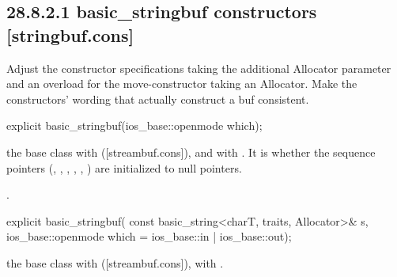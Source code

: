 \documentclass[ebook,11pt,article]{memoir}
\renewcommand{\iref}[1]{[#1]}
\begin{document}



\subsection{28.8.2.1 basic\_stringbuf constructors [stringbuf.cons]}
\begin{em}
Adjust the constructor specifications taking the additional Allocator parameter and an overload for the move-constructor taking an Allocator. Make the constructors' wording that actually construct a buf consistent.
\end{em}

\begin{itemdecl}
explicit basic_stringbuf(ios_base::openmode which);
\end{itemdecl}

\begin{itemdescr}
\pnum
\effects
{} the base class with
(\iref{streambuf.cons}), and
with .
It is
whether the sequence pointers
(, , ,
, , )
are initialized to null pointers.

\pnum
\ensures
{}.
\end{itemdescr}

\begin{itemdecl}
explicit basic_stringbuf(
  const basic_string<charT, traits, Allocator>& s,
  ios_base::openmode which = ios_base::in | ios_base::out);
\end{itemdecl}

\begin{itemdescr}
\pnum
\effects
{} the base class with
(\iref{streambuf.cons}), 
with  .
\end{itemdescr}
\end{document}
